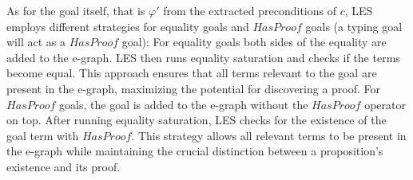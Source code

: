 As for the goal itself, that is $\varphi'$ from the extracted preconditions of $c$, LES employs different strategies for equality goals and $HasProof$ goals (a typing goal will act as a $HasProof$ goal):
For equality goals both sides of the equality are added to the e-graph. 
LES then runs equality saturation and checks if the terms become equal. 
This approach ensures that all terms relevant to the goal are present in the e-graph, maximizing the potential for discovering a proof.
For $HasProof$ goals, the goal is added to the e-graph without the $HasProof$ operator on top. 
After running equality saturation, LES checks for the existence of the goal term with $HasProof$. 
This strategy allows all relevant terms to be present in the e-graph while maintaining the crucial distinction between a proposition's existence and its proof.